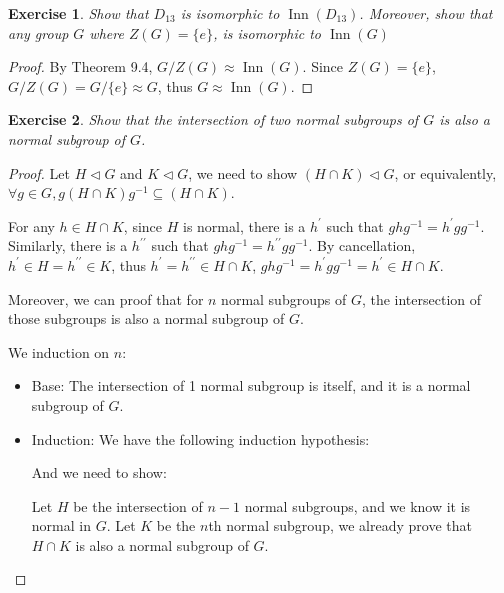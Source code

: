 \documentclass[14pt]{extarticle}
\newtheorem{exercise}{Exercise}[section]
\newcommand{\inv}[1]{#1^{-1}}
\newcommand{\normalin}{\triangleleft}
\newcommand{\1}{\{ e \}}
\DeclareMathOperator{\Inn}{Inn}
\begin{document}
\setcounter{exercise}{46}
\begin{exercise}
  Show that $D_{13}$ is isomorphic to $\Inn(D_{13})$. Moreover,
  show that any group $G$ where $Z(G) = \{ e \}$, is isomorphic to $\Inn(G)$
\end{exercise}
\begin{proof}
  By Theorem 9.4, $G/Z(G) \approx \Inn(G)$.
  Since $Z(G) = \{ e \}$, $G/Z(G) = G/\{ e \} \approx G$, thus $G \approx \Inn(G)$.
\end{proof}

\setcounter{exercise}{56}
\begin{exercise}
  Show that the intersection of two normal subgroups of $G$ is also a normal subgroup of $G$.
\end{exercise}
\begin{proof}
  Let $H \normalin G$ and $K \normalin G$, we need to show $(H \cap K) \normalin G$,
  or equivalently, $\forall g \in G, g(H \cap K)\inv{g} \subseteq (H \cap K)$.

  For any $h \in H \cap K$, since $H$ is normal, there is a $h^\prime$ 
  such that $gh\inv{g} = h^\prime g \inv{g}$. Similarly, there is a $h^{\prime\prime}$
  such that $gh\inv{g} = h^{\prime\prime} g \inv{g}$. By cancellation, 
  $h^\prime \in H = h^{\prime\prime} \in K$, thus $h^\prime = h^{\prime\prime} \in H \cap K$,
  $gh\inv{g} = h^\prime g \inv{g} = h^\prime \in H \cap K$.

  Moreover, we can proof that for $n$ normal subgroups of $G$, the intersection of
  those subgroups is also a normal subgroup of $G$.

  We induction on $n$:

  \begin{itemize}
    \item Base: The intersection of 1 normal subgroup is itself, and it is a normal subgroup of $G$.
    \item Induction: We have the following induction hypothesis:
      \begin{center}
      \end{center}
      And we need to show:
      \begin{center}
      \end{center}

      Let $H$ be the intersection of $n - 1$ normal subgroups, and we know it is normal in $G$.
      Let $K$ be the $n$th normal subgroup, we already prove that $H \cap K$ is also a normal subgroup of $G$.
  \end{itemize}
\end{proof}
\end{document}
